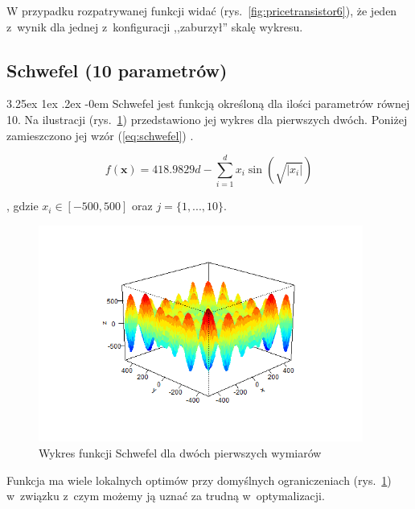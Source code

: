 \documentclass[11pt, a4paper]{article}
\makeatletter
\newcommand{\fbi}{\leavevmode{\parindent=1em\indent}}
\renewcommand\paragraph{\@startsection{paragraph}{5}{\z@}
  {3.25ex \@plus1ex \@minus.2ex}
  {-0em}
  {\normalfont\normalsize\bfseries}}
\makeatother
\begin{document}
\fbi
W przypadku rozpatrywanej funkcji widać (rys.~\ref{fig:pricetransistor6}), że jeden z~wynik dla jednej z~konfiguracji ,,zaburzył'' skalę wykresu.

\newpage
\subsection{Schwefel (10 parametrów)}
\paragraph{}
Schwefel jest funkcją określoną dla ilości parametrów równej 10. Na ilustracji (rys.~\ref{fig:schwefel1}) przedstawiono jej wykres dla pierwszych dwóch. Poniżej zamieszczono jej wzór (\ref{eq:schwefel}) \cite{test4}.

\begin{equation}\label{eq:schwefel}
f(\boldsymbol{x}) = 418.9829d - \sum_{i=1}^{d} x_i \sin(\sqrt{|x_i|})
\end{equation}

, gdzie $ x_i \in [-500, 500]$ oraz $j = \{1, ..., 10\}$.

\begin{figure}[H]
	\begin{center}
		\includegraphics[width=0.95\textwidth]{./assets/Schwefel1.png}
		\caption{Wykres funkcji Schwefel dla dwóch pierwszych wymiarów}
		\label{fig:schwefel1}
	\end{center}
\end{figure}

\fbi
Funkcja ma wiele lokalnych optimów przy domyślnych ograniczeniach (rys.~\ref{fig:schwefel1}) w~związku z~czym możemy ją uznać za trudną w~optymalizacji. 
\end{document}
